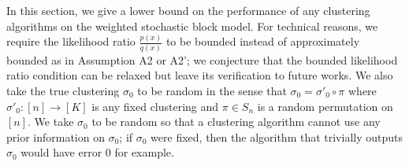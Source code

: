 \message{ !name(paper_all_in_one.tex)}\documentclass{article}
\begin{document}


In this section, we give a lower bound on the performance of any clustering algorithms on the weighted stochastic block model. For technical reasons, we require the likelihood ratio $\frac{p(x)}{q(x)}$ to be bounded instead of approximately bounded as in Assumption A2 or A2'; we conjecture that the bounded likelihood ratio condition can be relaxed but leave its verification to future works. We also take the true clustering $\sigma_0$ to be random in the sense that $\sigma_0 = \sigma'_0 \circ \pi$ where $\sigma'_0 : [n] \rightarrow [K]$ is any fixed clustering and $\pi \in S_n$ is a random permutation on $[n]$. We take $\sigma_0$ to be random so that a clustering algorithm cannot use any prior information on $\sigma_0$; if $\sigma_0$ were fixed, then the algorithm that trivially outputs $\sigma_0$ would have error 0 for example.

\end{document}

